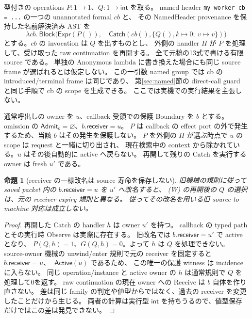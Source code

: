 \documentclass[11pt,a4paper]{article}
\newtheorem{proposition}[definition]{命題}
\newcommand{\Act}{\mathsf{Active}}
\begin{document}
型付きの operations \(P:1\to1\)、\(Q:1\to\mathsf{int}\) を取る。
named header \texttt{my worker cb = ...} の一つの unannotated formal \(cb\) と、
その NamedHeader provenance を保持した名前解決済み AST を
\[
 \lambda cb.\ \mathsf{Block}\bigl(
      \mathsf{Expr}(P()),\quad
      \mathsf{Catch}(cb(),\{Q(),k\mapsto0;\ v\mapsto v\})\bigr)
 \tag{W}
\]
とする。\(cb\) の invocation は \(Q\) を出すものとし、
外側の handler \(H\) が \(P\) を処理して、受け取った raw continuation を再開する。
全て元稿の13式で書ける有限 source である。
単独の Anonymous lambda に書き換えた場合にも同じ source frame が選ばれるとは仮定しない。
この一引数 named group では cb の introduced/terminal frame は同じであり、
第\ref{sec:named}節の direct-call guard と同じ手順で cb の scope を生成できる。
ここでは実機での実行結果を主張しない。

通常呼出しの owner を \(u\)、callback 受領での保護 Boundary を \(b\) とする。
omission の \(\mathsf{Admit}_b=\varnothing\)、\(b.\mathsf{receiver}=u\)。
\(P\) は callback の effect port の外で発生するため、当該 \(b\) はその発生を保護しない。
\(P\) を外側の \(H\) が選ぶ時点で \(u\) の scope は request と一緒に切り出され、
現在検索中の context から除かれている。\(u\) はその後自動的に active へ戻らない。
再開して残りの Catch を実行する owner は fresh \(u'\) である。

\begin{proposition}[receiver の一様改名は source 寿命を保存しない]
\label{prop:old-failure}
旧機械の規則に従って saved packet 内の \(b.\mathsf{receiver}=u\) を \(u'\) へ改名すると、
(W) の再開後の \(Q\) の選択は、元の receiver expiry 規則と異なる。
従ってその改名を用いる旧 source-to-machine 対応は成立しない。
\end{proposition}
\begin{proof}
再開した Catch の handler \(h\) は owner \(u'\) を持つ。
callback の typed path とその実行時 Observe は実際に存在する。
旧改名では \(b.\mathsf{receiver}=u'\) で active となり、
\(P(Q,h)=1\)、\(G(Q,h)=0\)。よって \(h\) は \(Q\) を処理できない。
source-owner 機械の unwind/enter 規則で元の receiver を固定すると
\(b.\mathsf{receiver}=u\)、\(\neg\Act(u)\) であるため、
この唯一の保護 witness は incidence に入らない。
同じ operation/instance と active owner の \(h\) は通常規則で \(Q\) を処理して0を返す。
raw continuation の現在 owner への Receive は \(b\) 自体を作り直さない。
差は同じ family の判定や値型からではなく、過去の receiver を変更したことだけから生じる。
両者の計算は実行型 \(\mathsf{int}\) を持ちうるので、値型保存だけではこの差は発見できない。
\end{proof}
\end{document}
